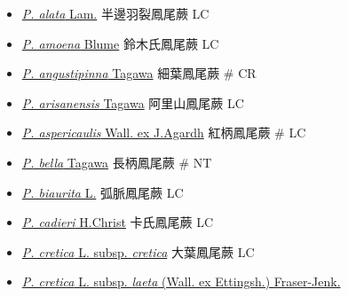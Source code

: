 \begin{itemize}
  \begin{itemize}
        \item[] \href{http://www.theplantlist.org/tpl1.1/search?q=Pteris+alata}{\textit{P. alata} Lam.}   半邊羽裂鳳尾蕨   LC
        \item[] \href{http://www.theplantlist.org/tpl1.1/search?q=Pteris+amoena}{\textit{P. amoena} Blume}   鈴木氏鳳尾蕨   LC
        \item[] \href{http://www.theplantlist.org/tpl1.1/search?q=Pteris+angustipinna}{\textit{P. angustipinna} Tagawa}   細葉鳳尾蕨  \# CR
        \item[] \href{http://www.theplantlist.org/tpl1.1/search?q=Pteris+arisanensis}{\textit{P. arisanensis} Tagawa}   阿里山鳳尾蕨   LC
        \item[] \href{http://www.theplantlist.org/tpl1.1/search?q=Pteris+aspericaulis}{\textit{P. aspericaulis} Wall. ex J.Agardh}   紅柄鳳尾蕨  \# LC
        \item[] \href{http://www.theplantlist.org/tpl1.1/search?q=Pteris+bella}{\textit{P. bella} Tagawa}   長柄鳳尾蕨  \# NT
        \item[] \href{http://www.theplantlist.org/tpl1.1/search?q=Pteris+biaurita}{\textit{P. biaurita} L.}   弧脈鳳尾蕨   LC
        \item[] \href{http://www.theplantlist.org/tpl1.1/search?q=Pteris+cadieri}{\textit{P. cadieri} H.Christ}   卡氏鳳尾蕨   LC
        \item[] \href{http://www.theplantlist.org/tpl1.1/search?q=Pteris+cretica+subsp.+cretica}{\textit{P. cretica} L. subsp. \textit{cretica}}  
                                        大葉鳳尾蕨   LC
        \item[] \href{http://www.theplantlist.org/tpl1.1/search?q=Pteris+cretica+subsp.+laeta}{\textit{P. cretica} L. subsp. \textit{laeta} (Wall. ex Ettingsh.) Fraser-Jenk.}  

\end{itemize}
\end{itemize}
